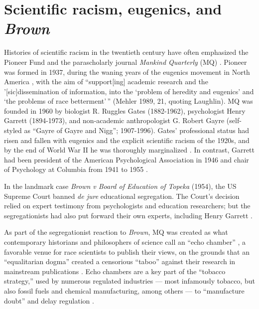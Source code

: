 \documentclass[12pt]{article}
\begin{document}
\hypertarget{scientific-racism-eugenics-and-brown}{%
\section*{\texorpdfstring{Scientific racism, eugenics, and \emph{Brown}}{Scientific racism, eugenics, and Brown}}\label{scientific-racism-eugenics-and-brown}}

Histories of scientific racism in the twentieth century have often emphasized the Pioneer Fund and the parascholarly journal \emph{Mankind Quarterly} (MQ) \cite{
MehlerFoundationFascismNew1989,
BarkanRetreatScientificRacism1992,
WinstonScienceServiceFar1998,
TuckerFundingScientificRacism2002,
SchafferScientificRacismAgain2007,
SainiSuperiorReturnRace2019,
WinstonScientificRacismNorth2020,
AdamsMisAppropriationBiological2021,
SainiDraperMillionsPhilanthropic2022
}. Pioneer was formed in 1937, during the waning years of the eugenics movement in North America \cite{BarkanRetreatScientificRacism1992}, with the aim of ``support{[}ing{]} academic research and the '{[}sic{]}dissemination of information, into the `problem of heredity and eugenics' and `the problems of race betterment'\,'' (Mehler 1989, 21, quoting Laughlin). MQ was founded in 1960 by biologist R. Ruggles Gates (1882-1962), psychologist Henry Garrett (1894-1973), and non-academic anthropologist G. Robert Gayre (self-styled as ``Gayre of Gayre and Nigg''; 1907-1996). Gates' professional status had risen and fallen with eugenics and the explicit scientific racism of the 1920s, and by the end of World War II he was thoroughly marginalized \cite{WinstonScienceServiceFar1998}. In contrast, Garrett had been president of the American Psychological Association in 1946 and chair of Psychology at Columbia from 1941 to 1955 \cite{WinstonScienceServiceFar1998}.

In the landmark case \emph{Brown v Board of Education of Topeka} (1954), the US Supreme Court banned \emph{de jure} educational segregation. The Court's decision relied on expert testimony from psychologists and education researchers; but the segregationists had also put forward their own experts, including Henry Garrett \cite{WinstonScienceServiceFar1998, JacksonScienceSegregationRace2005, SchafferScientificRacismAgain2007}.

As part of the segregationist reaction to \emph{Brown}, MQ was created as what contemporary historians and philosophers of science call an ``echo chamber'' \cite{FernandezPintoKnowBetterNot2017}, a favorable venue for race scientists to publish their views, on the grounds that an ``equalitarian dogma'' created a censorious ``taboo'' against their research in mainstream publications \cite{TuckerFundingScientificRacism2002, JacksonMythicalTabooRace2020}. Echo chambers are a key part of the ``tobacco strategy,'' used by numerous regulated industries --- most infamously tobacco, but also fossil fuels and chemical manufacturing, among others --- to ``manufacture doubt'' and delay regulation \cite{OreskesMerchantsDoubtHow2011, JasnyEmpiricalExaminationEcho2015, FernandezPintoKnowBetterNot2017, WeatherallHowBeatScience2018}.
\end{document}
